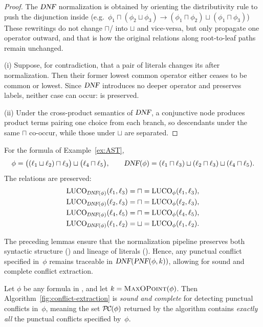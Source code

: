 \begin{proof}
The $\textsl{DNF}$ normalization is obtained by orienting the distributivity rule to push the disjunction inside 
(e.g.\ $\phi_1\sqcap(\phi_2\sqcup\phi_3)\!\to\!(\phi_1\sqcap\phi_2)\sqcup(\phi_1\sqcap\phi_3)$)
These rewritings do not change $\sqcap$/ into $\sqcup$  and vice-versa, but only propagate one operator outward,
and that is how the original relations along root-to-leaf paths remain unchanged.

(i) Suppose, for contradiction, that a pair of literals changes its \LUCO after
normalization. Then their former lowest common operator either ceases to be common or
lowest. Since $\textsl{DNF}$ introduces no deeper operator and preserves labels, neither case can
occur: \LUCO is preserved.

(ii) Under the cross-product semantics of $\textsl{DNF}$, a conjunctive node produces product terms
pairing one choice from each branch, so descendants under the same $\sqcap$ co-occur,
while those under $\sqcup$ are separated.
\end{proof}

\begin{example}
For the formula of Example~\ref{ex:AST},
\[
\phi = \big((\ell_1 \sqcup \ell_2)\sqcap \ell_3\big)\sqcup\big(\ell_4 \sqcap \ell_5\big),
\qquad
\textsl{DNF}(\phi) = (\ell_1 \sqcap \ell_3)\sqcup(\ell_2 \sqcap \ell_3)\sqcup(\ell_4 \sqcap \ell_5).
\]
The \LUCO relations are preserved:
\[
\begin{aligned}
\mathrm{LUCO}_{\textsl{DNF}(\phi)}(\ell_1,\ell_3)&=\sqcap=\mathrm{LUCO}_{\phi}(\ell_1,\ell_3),\\
\mathrm{LUCO}_{\textsl{DNF}(\phi)}(\ell_2,\ell_3)&=\sqcap=\mathrm{LUCO}_{\phi}(\ell_2,\ell_3),\\
\mathrm{LUCO}_{\textsl{DNF}(\phi)}(\ell_4,\ell_5)&=\sqcap=\mathrm{LUCO}_{\phi}(\ell_4,\ell_5),\\
\mathrm{LUCO}_{\textsl{DNF}(\phi)}(\ell_1,\ell_2)&=\sqcup=\mathrm{LUCO}_{\phi}(\ell_1,\ell_2).
\end{aligned}
\]

\end{example}

\medskip
The preceding lemmas ensure that the normalization pipeline preserves both
syntactic structure (\LUCO) and lineage of literals (\LAP). Hence, any punctual conflict
specified in~$\phi$ remains traceable in $\textsl{DNF}(\textsl{PNF}(\phi,k))$, allowing for sound and
complete conflict extraction.

\begin{theorem}
\label{thm:conflict-sound-complete}
Let $\phi$ be any formula in \TDDLfm, and let $k=\textsc{MaxOPoint}(\phi)$.  
Then Algorithm~\ref{fig:conflict-extraction} is \emph{sound and complete} for detecting
punctual conflicts in~$\phi$, meaning the set $\mathcall{PC}(\phi)$ returned by the algorithm
contains \emph{exactly all} the punctual conflicts specified by~$\phi$.
\end{theorem}

